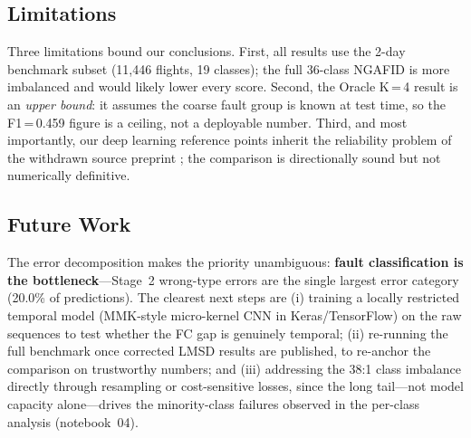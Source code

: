 \subsection{Limitations}
\label{subsec:limitations}

Three limitations bound our conclusions. First, all results use the 2-day
benchmark subset (11{,}446 flights, 19 classes); the full 36-class NGAFID is more
imbalanced and would likely lower every score. Second, the Oracle K\,=\,4 result
is an \emph{upper bound}: it assumes the coarse fault group is known at test time,
so the F1\,=\,0.459 figure is a ceiling, not a deployable number. Third, and most
importantly, our deep learning reference points inherit the reliability problem of
the withdrawn source preprint \cite{lmsd2025}; the comparison is directionally
sound but not numerically definitive.

\subsection{Future Work}
\label{subsec:future}

The error decomposition makes the priority unambiguous: \textbf{fault
classification is the bottleneck}---Stage~2 wrong-type errors are the single
largest error category (20.0\% of predictions). The clearest next steps are (i) training a locally restricted temporal
model (MMK-style micro-kernel CNN in Keras/TensorFlow) on the raw sequences to
test whether the FC gap is genuinely temporal; (ii) re-running the full benchmark
once corrected LMSD results are published, to re-anchor the comparison on
trustworthy numbers; and (iii) addressing the 38:1 class imbalance directly
through resampling or cost-sensitive losses, since the long tail---not model
capacity alone---drives the minority-class failures observed in the per-class
analysis (notebook~04).
